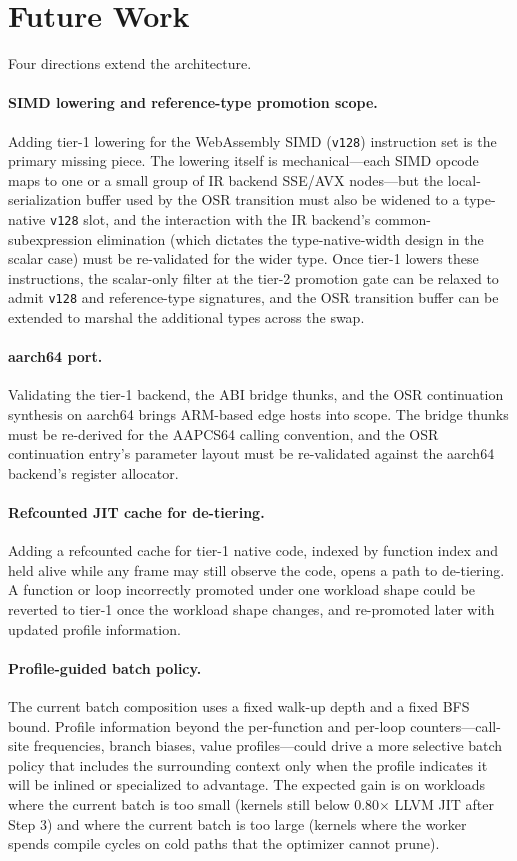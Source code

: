 \section{Future Work}
\label{sec:conclusion:future}

Four directions extend the architecture.

\paragraph{SIMD lowering and reference-type promotion scope.} Adding tier-1 lowering for the WebAssembly SIMD (\texttt{v128}) instruction set is the primary missing piece. The lowering itself is mechanical---each SIMD opcode maps to one or a small group of IR backend SSE/AVX nodes---but the local-serialization buffer used by the OSR transition must also be widened to a type-native \texttt{v128} slot, and the interaction with the IR backend's common-subexpression elimination (which dictates the type-native-width design in the scalar case) must be re-validated for the wider type. Once tier-1 lowers these instructions, the scalar-only filter at the tier-2 promotion gate can be relaxed to admit \texttt{v128} and reference-type signatures, and the OSR transition buffer can be extended to marshal the additional types across the swap.

\paragraph{aarch64 port.} Validating the tier-1 backend, the ABI bridge thunks, and the OSR continuation synthesis on aarch64 brings ARM-based edge hosts into scope. The bridge thunks must be re-derived for the AAPCS64 calling convention, and the OSR continuation entry's parameter layout must be re-validated against the aarch64 backend's register allocator.

\paragraph{Refcounted JIT cache for de-tiering.} Adding a refcounted cache for tier-1 native code, indexed by function index and held alive while any frame may still observe the code, opens a path to de-tiering. A function or loop incorrectly promoted under one workload shape could be reverted to tier-1 once the workload shape changes, and re-promoted later with updated profile information.

\paragraph{Profile-guided batch policy.} The current batch composition uses a fixed walk-up depth and a fixed BFS bound. Profile information beyond the per-function and per-loop counters---call-site frequencies, branch biases, value profiles---could drive a more selective batch policy that includes the surrounding context only when the profile indicates it will be inlined or specialized to advantage. The expected gain is on workloads where the current batch is too small (kernels still below 0.80$\times$ LLVM JIT after Step 3) and where the current batch is too large (kernels where the worker spends compile cycles on cold paths that the optimizer cannot prune).
